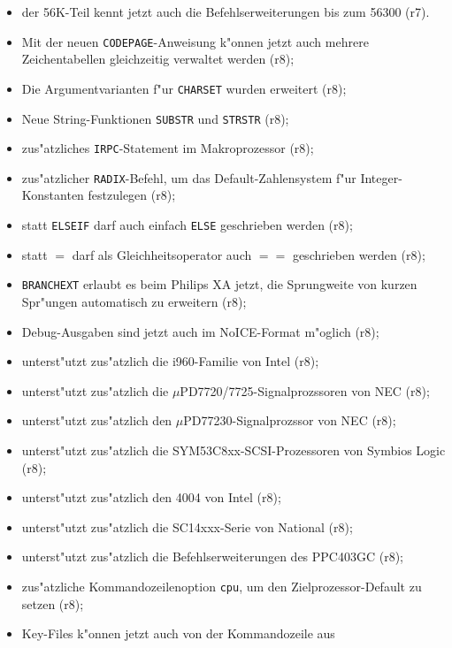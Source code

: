 \documentclass[12pt,a4paper,twoside]{report}
\newcommand{\tty}[1]{{\tt #1}}
\begin{document}
\begin{itemize}
{\begin{itemize}
{            68040 (r7);}
      \item{der 56K-Teil kennt jetzt auch die Befehlserweiterungen bis zum
            56300 (r7).}
      \item{Mit der neuen \tty{CODEPAGE}-Anweisung k"onnen jetzt auch
            mehrere Zeichentabellen gleichzeitig verwaltet werden (r8);}
      \item{Die Argumentvarianten f"ur \tty{CHARSET} wurden erweitert
            (r8);}
      \item{Neue String-Funktionen \tty{SUBSTR} und \tty{STRSTR} (r8);}
      \item{zus"atzliches \tty{IRPC}-Statement im Makroprozessor (r8);}
      \item{zus"atzlicher {\tt RADIX}-Befehl, um das Default-Zahlensystem
            f"ur Integer-Konstanten festzulegen (r8);}
      \item{statt {\tt ELSEIF} darf auch einfach {\tt ELSE} geschrieben
            werden (r8);}
      \item{statt $=$ darf als Gleichheitsoperator auch $==$ geschrieben
            werden (r8);}
      \item{\tty{BRANCHEXT} erlaubt es beim Philips XA jetzt, die
            Sprungweite von kurzen Spr"ungen automatisch zu erweitern
            (r8);}
      \item{Debug-Ausgaben sind jetzt auch im NoICE-Format m"oglich (r8);}
      \item{unterst"utzt zus"atzlich die i960-Familie von Intel (r8);}
      \item{unterst"utzt zus"atzlich die $\mu$PD7720/7725-Signalprozssoren
            von NEC (r8);}
      \item{unterst"utzt zus"atzlich den $\mu$PD77230-Signalprozssor von
            NEC (r8);}
      \item{unterst"utzt zus"atzlich die SYM53C8xx-SCSI-Prozessoren von
            Symbios Logic (r8);}
      \item{unterst"utzt zus"atzlich den 4004 von Intel (r8);}
      \item{unterst"utzt zus"atzlich die SC14xxx-Serie von National (r8);}
      \item{unterst"utzt zus"atzlich die Befehlserweiterungen des PPC403GC
            (r8);}
      \item{zus"atzliche Kommandozeilenoption {\tt cpu}, um den
            Zielprozessor-Default zu setzen (r8);}
      \item{Key-Files k"onnen jetzt auch von der Kommandozeile aus
}
\end{itemize}}
\end{itemize}
\end{document}
